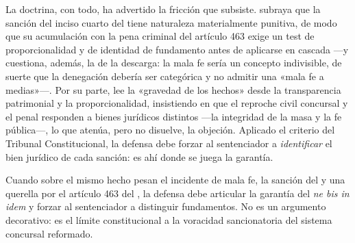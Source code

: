 La doctrina, con todo, ha advertido la fricción que subsiste. \textcite{alarcon-mala-fe} subraya
que la sanción del inciso cuarto del  tiene naturaleza materialmente punitiva, de modo
que su acumulación con la pena criminal del artículo 463 exige un test de proporcionalidad y de
identidad de fundamento antes de aplicarse en cascada ---y cuestiona, además, la
 de la descarga: la mala fe sería un concepto indivisible, de suerte
que la denegación debería ser categórica y no admitir una «mala fe a medias»---. Por su parte,
\textcite{goldenberg-gravedad-hechos} lee la «gravedad de los hechos» desde la transparencia
patrimonial y la proporcionalidad, insistiendo en que el reproche civil concursal y el penal
responden a bienes jurídicos distintos ---la integridad de la masa y la fe pública---, lo que
atenúa, pero no disuelve, la objeción. Aplicado el criterio del Tribunal Constitucional, la
defensa debe forzar al sentenciador a \emph{identificar} el bien jurídico de cada sanción: es ahí
donde se juega la garantía.

\begin{foco}
Cuando sobre el mismo hecho pesan el incidente de mala fe, la sanción del  y una
querella por el artículo 463 del \cpen{}, la defensa debe articular la garantía del \emph{ne bis in
idem} y forzar al sentenciador a distinguir fundamentos. No es un argumento decorativo: es el
límite constitucional a la voracidad sancionatoria del sistema concursal reformado.
\end{foco}
